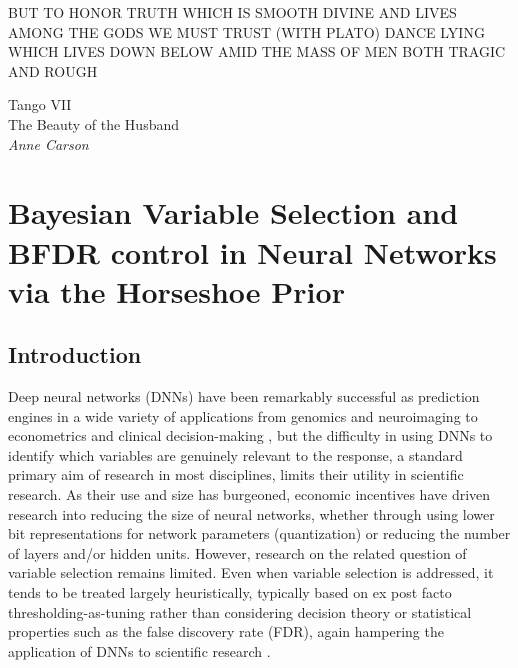 %
\epigraph{BUT TO HONOR TRUTH WHICH IS SMOOTH DIVINE AND LIVES AMONG THE GODS WE MUST TRUST (WITH PLATO) DANCE LYING WHICH LIVES DOWN BELOW AMID THE MASS OF MEN BOTH TRAGIC AND ROUGH}{Tango VII \\ The Beauty of the Husband \\ \textit{Anne Carson}}

\chapter{Bayesian Variable Selection and BFDR control in Neural Networks via the Horseshoe Prior}
\label{chap:horseshoe}


\section{Introduction}
\label{sec:ch3-intro}
 
Deep neural networks (DNNs) have been remarkably successful as prediction engines in 
a wide variety of applications from genomics and
neuroimaging to econometrics and clinical decision-making \citep{goodfellow_deep_2016}, but
the difficulty in using DNNs to identify which variables are genuinely relevant to the response,
a standard primary aim of research in most disciplines, limits their utility
in scientific research.  As their use and size has burgeoned, 
economic incentives have driven research into reducing the size of neural networks, whether 
through using lower bit representations for network parameters (quantization) or reducing the number of layers and/or hidden units.  However,
research on the related question of variable selection remains limited.  Even when variable selection is addressed, it tends to be treated largely heuristically, typically based on ex post facto thresholding-as-tuning
rather than considering decision theory or statistical properties such as the false discovery rate (FDR),
again hampering the application of DNNs to scientific research \citep{miotto_deep_2017, vasudevan_off--shelf_2021}.

